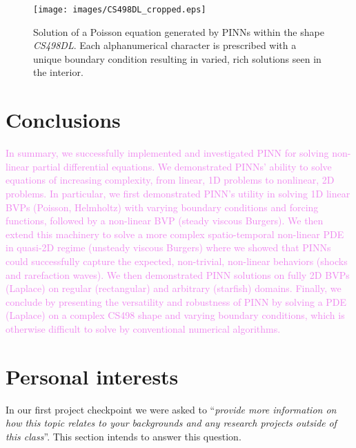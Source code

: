 \documentclass[11pt]{article}
\newcommand{\newcontent}[1]{\textcolor{violet}{#1}}
\begin{document}
\begin{figure}[htbp]
\centering
\texttt{[image: images/CS498DL\_cropped.eps]}
\caption{\label{fig:cs498_poisson_results}Solution of a Poisson equation generated by PINNs within the shape \emph{CS498DL}. Each alphanumerical character is prescribed with a unique boundary condition resulting in varied, rich solutions seen in the interior.}
\end{figure}

\section{Conclusions}
\label{sec:org31592da}
\newcontent{
In summary, we successfully implemented and investigated PINN for solving
non-linear partial differential equations. We demonstrated PINNs’ ability to
solve equations of increasing complexity, from linear, 1D problems to
nonlinear, 2D problems. In particular, we first demonstrated PINN's utility in
solving 1D linear BVPs (Poisson, Helmholtz) with varying boundary conditions
and forcing functions, followed by a non-linear BVP (steady viscous Burgers).
We then extend this machinery to solve a more complex spatio-temporal
non-linear PDE in quasi-2D regime (unsteady viscous Burgers) where we showed
that PINNs could successfully capture the expected, non-trivial, non-linear
behaviors (shocks and rarefaction waves). We then demonstrated PINN solutions
on fully 2D BVPs (Laplace) on regular (rectangular) and arbitrary (starfish)
domains. Finally, we conclude
by presenting the versatility and robustness of PINN by solving a PDE
(Laplace) on a complex CS498 shape and varying boundary conditions, which is
otherwise difficult to solve by conventional numerical algorithms.
}
\section{Personal interests}
\label{sec:orge2dd94e}
In our first project checkpoint we were asked to ``\emph{provide more information on}
\emph{how this topic relates to your backgrounds and any research projects outside}
\emph{of this class}''. This section intends to answer this question.
\end{document}
